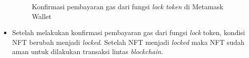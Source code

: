 \begin{itemize}
    \begin{figure} [H] \centering
      \caption{Konfirmasi pembayaran gas dari fungsi \emph{lock token} di Metamask Wallet}
      \label{fig:lock_token}
      \end{figure}
    
    \item Setelah melakukan konfirmasi pembayaran gas dari fungsi \emph{lock} token, kondisi NFT berubah menjadi \emph{locked}. Setelah NFT menjadi \emph{locked} maka NFT sudah aman untuk dilakukan transaksi lintas \emph{blockchain}. 
    

\end{itemize}
